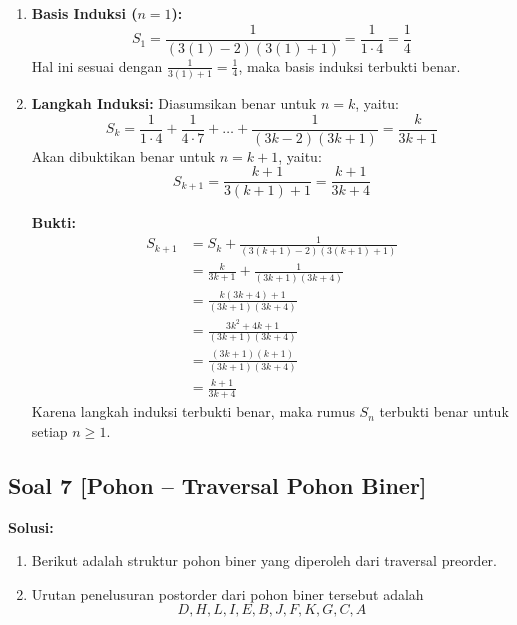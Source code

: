 \documentclass[12pt,a4paper]{article}
\begin{document}
\begin{enumerate}
    \item \textbf{Basis Induksi ($n = 1$):}
    \[ S_1 = \frac{1}{(3(1)-2)(3(1)+1)} = \frac{1}{1 \cdot 4} = \frac{1}{4} \]
    Hal ini sesuai dengan $\frac{1}{3(1)+1} = \frac{1}{4}$, maka basis induksi terbukti benar.

    \item \textbf{Langkah Induksi:}
    Diasumsikan benar untuk $n = k$, yaitu:
    \[ S_k = \frac{1}{1 \cdot 4} + \frac{1}{4 \cdot 7} + \dots + \frac{1}{(3k-2)(3k+1)} = \frac{k}{3k+1} \]
    Akan dibuktikan benar untuk $n = k + 1$, yaitu:
    \[ S_{k+1} = \frac{k+1}{3(k+1)+1} = \frac{k+1}{3k+4} \]

    \textbf{Bukti:}
    \begin{align*}
        S_{k+1} &= S_k + \frac{1}{(3(k+1)-2)(3(k+1)+1)} \\
        &= \frac{k}{3k+1} + \frac{1}{(3k+1)(3k+4)} \\
        &= \frac{k(3k+4) + 1}{(3k+1)(3k+4)} \\
        &= \frac{3k^2 + 4k + 1}{(3k+1)(3k+4)} \\
        &= \frac{(3k+1)(k+1)}{(3k+1)(3k+4)} \\
        &= \frac{k+1}{3k+4}
    \end{align*}
    Karena langkah induksi terbukti benar, maka rumus $S_n$ terbukti benar untuk setiap $n \geq 1$.
\end{enumerate}

\newpage
\subsection*{Soal 7 [Pohon -- Traversal Pohon Biner]}
\textbf{Solusi:}

\begin{enumerate}[label=(\alph*)]
    \item Berikut adalah struktur pohon biner yang diperoleh dari traversal preorder.
    \begin{center}
    \end{center}

    \item Urutan penelusuran postorder dari pohon biner tersebut adalah 
    \[ \boxed{D, H, L, I, E, B, J, F, K, G, C, A} \]
\end{enumerate}
\end{document}
